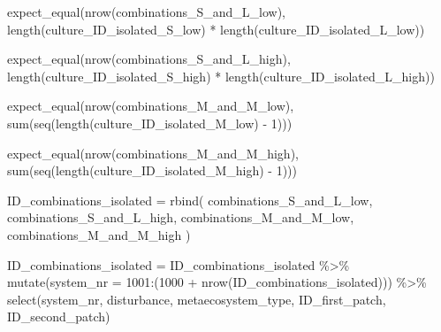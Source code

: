 \documentclass[
]{article}
\newenvironment{Shaded}{\begin{snugshade}}{\end{snugshade}}
\newcommand{\AttributeTok}[1]{\textcolor[rgb]{0.77,0.63,0.00}{#1}}
\newcommand{\DecValTok}[1]{\textcolor[rgb]{0.00,0.00,0.81}{#1}}
\newcommand{\FunctionTok}[1]{\textcolor[rgb]{0.00,0.00,0.00}{#1}}
\newcommand{\NormalTok}[1]{#1}
\newcommand{\OtherTok}[1]{\textcolor[rgb]{0.56,0.35,0.01}{#1}}
\newcommand{\SpecialCharTok}[1]{\textcolor[rgb]{0.00,0.00,0.00}{#1}}
\begin{document}
\begin{Shaded}
\begin{Highlighting}[]
\FunctionTok{expect\_equal}\NormalTok{(}\FunctionTok{nrow}\NormalTok{(combinations\_S\_and\_L\_low),}
             \FunctionTok{length}\NormalTok{(culture\_ID\_isolated\_S\_low) }\SpecialCharTok{*} \FunctionTok{length}\NormalTok{(culture\_ID\_isolated\_L\_low))}

\FunctionTok{expect\_equal}\NormalTok{(}\FunctionTok{nrow}\NormalTok{(combinations\_S\_and\_L\_high),}
             \FunctionTok{length}\NormalTok{(culture\_ID\_isolated\_S\_high) }\SpecialCharTok{*} \FunctionTok{length}\NormalTok{(culture\_ID\_isolated\_L\_high))}

\FunctionTok{expect\_equal}\NormalTok{(}\FunctionTok{nrow}\NormalTok{(combinations\_M\_and\_M\_low),}
             \FunctionTok{sum}\NormalTok{(}\FunctionTok{seq}\NormalTok{(}\FunctionTok{length}\NormalTok{(culture\_ID\_isolated\_M\_low) }\SpecialCharTok{{-}} \DecValTok{1}\NormalTok{)))}

\FunctionTok{expect\_equal}\NormalTok{(}\FunctionTok{nrow}\NormalTok{(combinations\_M\_and\_M\_high),}
             \FunctionTok{sum}\NormalTok{(}\FunctionTok{seq}\NormalTok{(}\FunctionTok{length}\NormalTok{(culture\_ID\_isolated\_M\_high) }\SpecialCharTok{{-}} \DecValTok{1}\NormalTok{)))}

\NormalTok{ID\_combinations\_isolated }\OtherTok{=} \FunctionTok{rbind}\NormalTok{(}
\NormalTok{  combinations\_S\_and\_L\_low,}
\NormalTok{  combinations\_S\_and\_L\_high,}
\NormalTok{  combinations\_M\_and\_M\_low,}
\NormalTok{  combinations\_M\_and\_M\_high}
\NormalTok{) }

\NormalTok{ID\_combinations\_isolated }\OtherTok{=}\NormalTok{ ID\_combinations\_isolated }\SpecialCharTok{\%\textgreater{}\%}
  \FunctionTok{mutate}\NormalTok{(}\AttributeTok{system\_nr =} \DecValTok{1001}\SpecialCharTok{:}\NormalTok{(}\DecValTok{1000} \SpecialCharTok{+} \FunctionTok{nrow}\NormalTok{(ID\_combinations\_isolated))) }\SpecialCharTok{\%\textgreater{}\%}
  \FunctionTok{select}\NormalTok{(system\_nr,}
\NormalTok{         disturbance,}
\NormalTok{         metaecosystem\_type,}
\NormalTok{         ID\_first\_patch,}
\NormalTok{         ID\_second\_patch)}


\end{Highlighting}
\end{Shaded}
\end{document}
